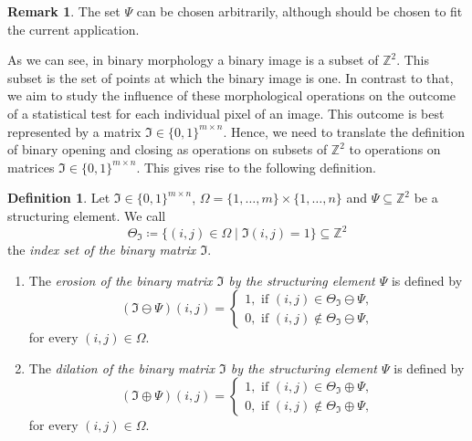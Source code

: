\documentclass[a4paper,12pt]{article}
\theoremstyle{plain}
\theoremstyle{definition}
\newtheorem{definition}[theorem]{Definition}
\newtheorem{remark}[theorem]{Remark}
\begin{document}
\begin{remark}
	The set $\Psi$ can be chosen arbitrarily, although should be chosen to fit the current application.
\end{remark}

As we can see, in binary morphology a binary image is a subset of $\mathbb{Z}^2$. This subset is the set of points at which the binary image is one. In contrast to that, we aim to study the influence of these morphological operations on the outcome of a statistical test for each individual pixel of an image. This outcome is best represented by a matrix $\mathfrak{I} \in \{ 0, 1 \}^{m \times n}$. Hence, we need to translate the definition of binary opening and closing as operations on subsets of $\mathbb{Z}^2$ to operations on matrices $\mathfrak{I} \in \{ 0, 1 \}^{m \times n}$. This gives rise to the following definition.

\begin{definition}
	Let $\mathfrak{I} \in \{ 0, 1 \}^{m \times n}$, $\Omega = \{ 1, \dots, m \} \times \{ 1, \dots, n \}$ and $\Psi \subseteq \mathbb{Z}^2$ be a structuring element. We call
	\begin{equation*}
		\Theta_\mathfrak{I} \coloneqq \{ (i, j) \in \Omega \mid \mathfrak{I}(i, j) = 1 \} \subseteq \mathbb{Z}^2
	\end{equation*}
	the \emph{index set of the binary matrix $\mathfrak{I}$}.
	\begin{enumerate}
		\item The \emph{erosion of the binary matrix $\mathfrak{I}$ by the structuring element $\Psi$} is defined by
		\begin{equation}
			(\mathfrak{I} \ominus \Psi)(i, j) =
			\begin{cases}
				1, \textrm{ if } (i, j) \in \Theta_\mathfrak{I} \ominus \Psi, \\
				0, \textrm{ if } (i, j) \notin \Theta_\mathfrak{I} \ominus \Psi,
			\end{cases}
		\end{equation}
		for every $(i, j) \in \Omega$.
		\item The \emph{dilation of the binary matrix $\mathfrak{I}$ by the structuring element $\Psi$} is defined by
		\begin{equation}
			(\mathfrak{I} \oplus \Psi)(i, j) =
			\begin{cases}
				1, \textrm{ if } (i, j) \in \Theta_\mathfrak{I} \oplus \Psi, \\
				0, \textrm{ if } (i, j) \notin \Theta_\mathfrak{I} \oplus \Psi,
			\end{cases}
		\end{equation}
		for every $(i, j) \in \Omega$.
	\end{enumerate}
\end{definition}
\end{document}
